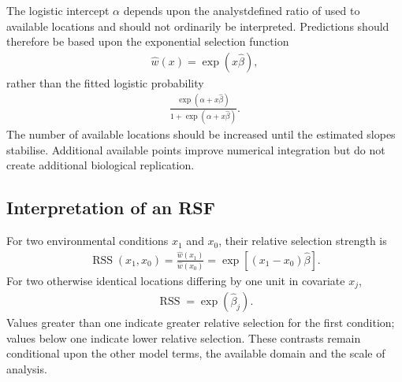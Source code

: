 \documentclass[letterpaper,10pt,english]{sphinxmanual}
\begin{document}
\sphinxAtStartPar
The logistic intercept \(\alpha\) depends upon the analyst\sphinxhyphen{}defined ratio of used to available locations and should not ordinarily be interpreted. Predictions should therefore be based upon the exponential selection function
\begin{equation*}
\begin{split}
\hat{w}(x)
=
\exp(x\hat{\beta}),
\end{split}
\end{equation*}
\sphinxAtStartPar
rather than the fitted logistic probability
\begin{equation*}
\begin{split}
\frac{
\exp(\alpha+x\hat{\beta})
}{
1+\exp(\alpha+x\hat{\beta})
}.
\end{split}
\end{equation*}
\sphinxAtStartPar
The number of available locations should be increased until the estimated slopes stabilise. Additional available points improve numerical integration but do not create additional biological replication.


\subsection{Interpretation of an RSF}
\label{\detokenize{theory:interpretation-of-an-rsf}}
\sphinxAtStartPar
For two environmental conditions \(x_1\) and \(x_0\), their relative selection strength is
\begin{equation*}
\begin{split}
\operatorname{RSS}(x_1,x_0)
=
\frac{
\hat{w}(x_1)
}{
\hat{w}(x_0)
}
=
\exp
\left[
(x_1-x_0)\hat{\beta}
\right].
\end{split}
\end{equation*}
\sphinxAtStartPar
For two otherwise identical locations differing by one unit in covariate \(x_j\),
\begin{equation*}
\begin{split}
\operatorname{RSS}
=
\exp(\hat{\beta}_j).
\end{split}
\end{equation*}
\sphinxAtStartPar
Values greater than one indicate greater relative selection for the first condition; values below one indicate lower relative selection. These contrasts remain conditional upon the other model terms, the available domain and the scale of analysis.
\end{document}
